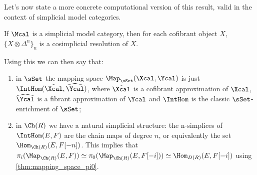         Let's now state a more concrete computational version of this result, valid in the context of simplicial model categories.
        \begin{lemma}
            \label{lemma:cosimplicial_resolution_in_simplicial_model}
            If $\Mcal$ is a simplicial model category, then for each cofibrant object $X$, $\{X \otimes \Delta^n\}_n$ is a cosimplicial resolution of $X$.
        \end{lemma}
        Using this we can then say that:
        \begin{enumerate}
            \item in $\sSet$ the mapping space $\Map_{\sSet}(\Xcal, \Ycal)$ is just $\IntHom(\tilde{\Xcal}, \widehat{\Ycal})$, where $\tilde{\Xcal}$ is a cofibrant approximation of $\Xcal$, $\widehat{\Ycal}$ is a fibrant approximation of $\Ycal$ and $\IntHom$ is the classic $\sSet$-enrichment of $\sSet$;
            \item in $\Ch(R)$ we have a natural simplicial structure: the n-simplices of $\IntHom(E, F)$ are the chain maps of degree $n$, or equivalently the set $\Hom_{\Ch(R)}(E, F[-n])$. This implies that $\pi_i( \Map_{\Ch(R)}(E, F) ) \simeq \pi_0( \Map_{\Ch(R)}(E, F[-i]) ) \simeq \Hom_{D(R)}(E, F[-i])$ using \cref{thm:mapping_space_pi0}.
        \end{enumerate}

